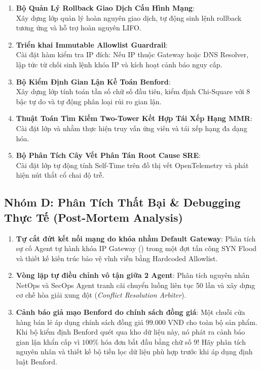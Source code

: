 \begin{enumerate}[label=\textbf{C\arabic*.}]
  \item \textbf{Bộ Quản Lý Rollback Giao Dịch Cấu Hình Mạng}: \\
  Xây dựng lớp  quản lý hoàn nguyên giao dịch, tự động sinh lệnh rollback tương ứng và hỗ trợ hoàn nguyên LIFO.
  \item \textbf{Triển khai Immutable Allowlist Guardrail}: \\
  Cài đặt hàm kiểm tra IP đích: Nếu IP thuộc Gateway hoặc DNS Resolver, lập tức từ chối sinh lệnh khóa IP và kích hoạt cảnh báo nguy cấp.
  \item \textbf{Bộ Kiểm Định Gian Lận Kế Toán Benford}: \\
  Xây dựng lớp  tính toán tần số chữ số đầu tiên, kiểm định Chi-Square với 8 bậc tự do và tự động phân loại rủi ro gian lận.
  \item \textbf{Thuật Toán Tìm Kiếm Two-Tower Kết Hợp Tái Xếp Hạng MMR}: \\
  Cài đặt lớp  và  nhằm thực hiện truy vấn ứng viên và tái xếp hạng đa dạng hóa.
  \item \textbf{Bộ Phân Tích Cây Vết Phân Tán Root Cause SRE}: \\
  Cài đặt lớp  tự động tính Self-Time trên đồ thị vết OpenTelemetry và phát hiện nút thắt cổ chai độ trễ.
\end{enumerate}

\subsection{Nhóm D: Phân Tích Thất Bại \& Debugging Thực Tế (Post-Mortem Analysis)}

\begin{enumerate}[label=\textbf{D\arabic*.}]
  \item \textbf{Tự cắt đứt kết nối mạng do khóa nhầm Default Gateway}:
  Phân tích sự cố Agent tự hành khóa IP Gateway () trong một đợt tấn công SYN Flood và thiết kế kiến trúc bảo vệ vĩnh viễn bằng Hardcoded Allowlist.
  \item \textbf{Vòng lặp tự điều chỉnh vô tận giữa 2 Agent}:
  Phân tích nguyên nhân NetOps và SecOps Agent tranh cãi chuyển luồng liên tục 50 lần và xây dựng cơ chế hòa giải xung đột (\textit{Conflict Resolution Arbiter}).
  \item \textbf{Cảnh báo giả mạo Benford do chính sách đồng giá}:
  Một chuỗi cửa hàng bán lẻ áp dụng chính sách đồng giá $99.000\text{ VNĐ}$ cho toàn bộ sản phẩm. Khi bộ kiểm định Benford quét qua kho dữ liệu này, nó phát ra cảnh báo gian lận khẩn cấp vì $100\%$ hóa đơn bắt đầu bằng chữ số 9! Hãy phân tích nguyên nhân và thiết kế bộ tiền lọc dữ liệu phù hợp trước khi áp dụng định luật Benford.
\end{enumerate}

